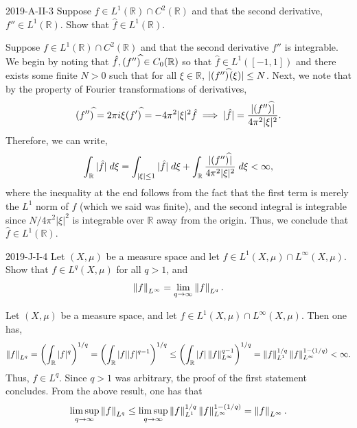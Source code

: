 \documentclass{article}
\begin{document}
	\begin{prb}{2019-A-II-3}
		Suppose $f \in L^{1}(\mathbb{R}) \cap C^{2}(\mathbb{R})$ and that the second derivative, $f'' \in L^{1}(\mathbb{R})$. Show that $\hat{f} \in L^{1}(\mathbb{R})$. 
	\end{prb}
	Suppose $f \in L^{1}(\mathbb{R}) \cap C^{2}(\mathbb{R})$ and that the second derivative $f''$ is integrable. We begin by noting that $\hat{f}, (f'')^{\widehat{}} \in C_{0}(\mathbb{R})$ so that $\hat{f} \in L^{1}([-1,1])$ and there exists some finite $N > 0$ such that for all $\xi \in \mathbb{R}$, $|(f'')^{\widehat{}}(\xi)| \leq N$. Next, we note that by the property of Fourier transformations of derivatives, 
	\begin{equation*}
		(f'')^{\widehat{}} = 2\pi i \xi (f')^{\widehat{}} = -4\pi^2|\xi|^2 \hat{f} \implies |\hat{f}| = \frac{|(f'')^{\widehat{}}|}{4\pi^2|\xi|^{2}}.  
	\end{equation*} 
	Therefore, we can write, 
	\begin{equation*}
		\int_{\mathbb{R}}|\hat{f}|\;d\xi = \int_{|\xi|\leq 1}|\hat{f}|\;d\xi + \int_{\mathbb{R}}\frac{|(f'')^{\widehat{}}|}{4\pi^2|\xi|^2}\;d\xi < \infty, 
	\end{equation*}
	where the inequality at the end follows from the fact that the first term is merely the $L^1$ norm of $\hat{f}$ (which we said was finite), and the second integral is integrable since $N/4\pi^2|\xi|^2$ is integrable over $\mathbb{R}$ away from the origin. Thus, we conclude that $\hat{f} \in L^1(\mathbb{R})$. 
	\begin{prb}{2019-J-I-4}
		Let $(X, \mu)$ be a measure space and let $f \in L^1(X,\mu) \cap L^\infty(X,\mu)$. Show that $f \in L^q(X,\mu)$ for all $q > 1$, and 
		\begin{equation*}
			\left\Vert f \right\Vert_{L^\infty} = \lim_{q \to \infty}\left\Vert f \right\Vert_{L^q}. 
		\end{equation*}
	\end{prb}
	Let $(X, \mu)$ be a measure space, and let $f \in L^1(X,\mu) \cap L^\infty(X,\mu)$. Then one has, 
	\begin{equation*}
		\left\Vert f \right\Vert_{L^q} = \left(\int_{\mathbb{R}}|f|^q\right)^{1/q} = \left(\int_{\mathbb{R}}|f||f|^{q - 1}\right)^{1/q} \leq \left(\int_{\mathbb{R}}|f|\left\Vert f \right\Vert_{L^\infty}^{q - 1}\right)^{1/q} = \left\Vert f \right\Vert_{L^1}^{1/q}\left\Vert f \right\Vert_{L^\infty}^{1 -(1/q)} < \infty. 
	\end{equation*}
	Thus, $f \in L^q$. Since $q > 1$ was arbitrary, the proof of the first statement concludes. From the above result, one has that 
	\begin{equation*}
		\limsup_{q \to \infty}\left\Vert f \right\Vert_{L^q} \leq \limsup_{q \to \infty}\left\Vert f \right\Vert_{L^1}^{1/q}\left\Vert f \right\Vert_{L^\infty}^{1 - (1/q)} = \left\Vert f \right\Vert_{L^\infty}. 
	\end{equation*}
\end{document}
